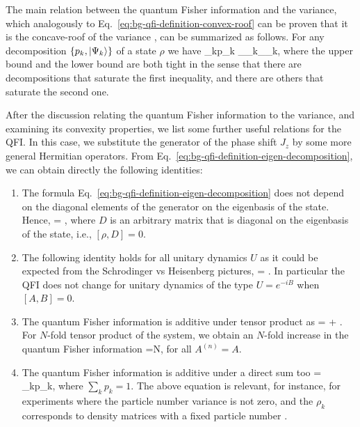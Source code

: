 The main relation between the quantum Fisher information and the variance, which analogously to Eq.~\eqref{eq:bg-qfi-definition-convex-roof} can be proven that it is the concave-roof of the variance \citep{MR91}, can be summarized as follows.
For any decomposition $\{p_k, \vert \Psi_k \rangle\}$ of a state $\rho$ we have
\be
  \qfi[\rho,J_z]\leq \sum_{k}p_k _{\Psi_k}\leq {}_{\Psi_k},
\ee
where the upper bound and the lower bound are both tight in the sense that there are decompositions that saturate the first inequality, and there are others that saturate the second one.

After the discussion relating the quantum Fisher information to the variance, and examining its convexity properties, we list some further useful relations for the QFI.
In this case, we substitute the generator of the phase shift $J_z$ by some more general Hermitian operators.
From Eq.~\eqref{eq:bg-qfi-definition-eigen-decomposition}, we can obtain directly the following identities:
\begin{enumerate}
  \item The formula Eq.~\eqref{eq:bg-qfi-definition-eigen-decomposition} does not depend on the diagonal elements of the generator on the eigenbasis of the state.
  Hence,
  \be
    \qfi[\rho, A] = \qfi[\rho, A+D],
  \ee
  where $D$ is an arbitrary matrix that is diagonal on the eigenbasis of the state, i.e., $[\rho,D]=0$.
  \item The following identity holds for all unitary dynamics $U$ as it could be expected from the Schrodinger vs Heisenberg pictures,
  \be
     = .
  \ee
  In particular the QFI does not change for unitary dynamics of the type $U=e^{-iB}$ when $[A,B]=0$.
  \item The quantum Fisher information is additive under tensor product as
  \be
     = \qfi[\rho^{(1)},A^{(1)}]+ \qfi[\rho^{(2)},A^{(2)}].
  \ee
  For $N$-fold tensor product of the system, we obtain an $N$-fold increase in the quantum Fisher information
  \be
    \qfi[\rho^{\otimes N},\textstyle\sum_{n=1}^{N}A^{(n)}]=N\qfi[\rho, A],
  \ee
  for all $A^{(n)}= A$.
  \item The quantum Fisher information is additive under a direct sum too \citep{MR103}
  \be
     = \sum_{k}p_k\qfi[\rho_k,A_k],
  \ee
  where $\sum_k p_k = 1$.
  The above equation is relevant, for instance, for experiments where the particle number variance is not zero, and the $\rho_k$ corresponds to density matrices with a fixed particle number \citep{MR104, MR105}.
\end{enumerate}

